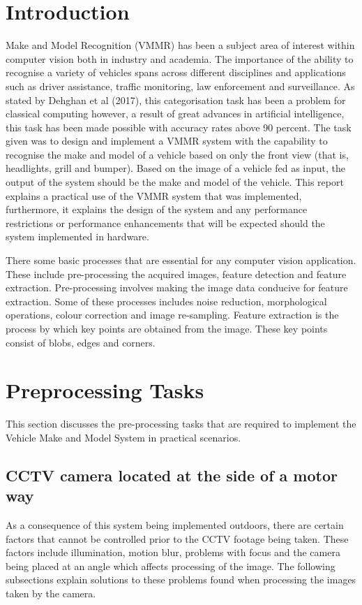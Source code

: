\documentclass[a4paper, 12pt]{article}
\begin{document}
 \section{Introduction}
 \onehalfspacing
 Make and Model Recognition (VMMR) has been a subject area of interest within computer vision both in industry and academia. The importance of the ability to recognise a variety of vehicles spans across different disciplines and applications such as driver assistance, traffic monitoring, law enforcement and surveillance. As stated by Dehghan et al (2017), this categorisation task has been a problem for classical computing however, a result of great advances in artificial intelligence, this task has been made possible with accuracy rates above 90 percent. The task given was to design and implement a VMMR system with the capability to recognise the make and model of a vehicle based on only the front view (that is, headlights, grill and bumper). Based on the image of a vehicle fed as input, the output of the system should be the make and model of the vehicle. This report explains a practical use of the VMMR system that was implemented, furthermore, it explains the design of the system and any performance restrictions or performance enhancements that will be expected should the system implemented in hardware.
\parskip 0.2in 

There some basic processes that are essential for any computer vision application. These include pre-processing the acquired images, feature detection and feature extraction. Pre-processing involves making the image data conducive for feature extraction. Some of these processes includes noise reduction, morphological operations, colour correction and image re-sampling. Feature extraction is the process by which key points are obtained from the image. These key points consist of blobs, edges and corners.
 
 \newpage
 
 \section{Preprocessing Tasks}
 This section discusses the pre-processing tasks that are required to implement the Vehicle Make and Model System in practical scenarios.
 
 \subsection{CCTV camera located at the side of a motor way}
 As a consequence of this system being implemented outdoors, there are certain factors that cannot be controlled prior to the CCTV footage being taken. These factors include illumination, motion blur, problems with focus and the camera being placed at an angle  which affects processing of the image. The following subsections explain solutions to these problems found when processing the images taken by the camera. 
 
\end{document}
